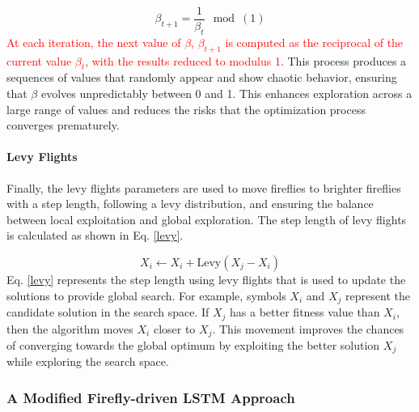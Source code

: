 \documentclass[journal]{IEEEtran}
\begin{document}
\begin{equation}
\label{fraq}
{\beta_{t+1}} = \frac{1}{\beta_t}{\mod(1)}
\end{equation}
\textcolor{red}{At each iteration, the next value of $\beta$, $\beta_{t+1}$ is computed as the reciprocal of the current value $\beta_t$, with the results reduced to modulus 1}. This process produces a sequences of values that randomly appear and show chaotic behavior, ensuring that $\beta$ evolves unpredictably between 0 and 1. This enhances exploration across a large range of values and reduces the risks that the optimization process converges prematurely.














\paragraph{Levy Flights}
Finally, the levy flights parameters
are used to move fireflies to brighter fireflies with a step length, following a levy distribution, and ensuring the balance between local exploitation and global exploration. The step length of levy flights is calculated as shown in Eq. \eqref{levy}.


\begin{equation}\label{levy}
    X_i \leftarrow X_i + \text{Levy}(X_j - X_i)
\end{equation}
Eq. \eqref{levy} represents the step length using levy flights that is used to update the solutions to provide global search.  For example, symbols \(X_i\) and \(X_j\) represent the candidate solution in the search space. If \(X_j\) has a better fitness value than \(X_i\), then the algorithm moves \(X_i\) closer to \(X_j\). This movement improves the chances of converging towards the global optimum by exploiting the better solution \(X_j\) while exploring the search space.








\subsubsection{A Modified Firefly-driven LSTM Approach}
\end{document}
